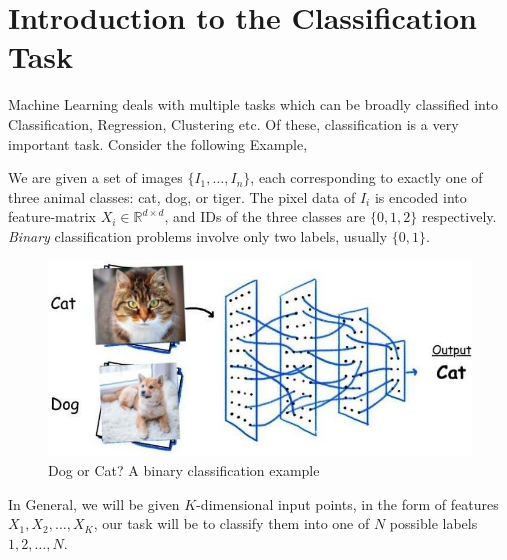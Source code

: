 \documentclass[12pt]{article}
\begin{document}
\section{Introduction to the Classification Task}
Machine Learning deals with multiple tasks which can be broadly classified into Classification, Regression, Clustering etc. Of these, classification is a very important task. Consider the following Example,

We are given a set of images $\{I_1, \dots, I_n\}$, each corresponding to exactly one of three animal classes: cat, dog, or tiger. The pixel data of $I_i$ is encoded into feature-matrix $X_i \in \mathbb{R}^{d\times d}$, and IDs of the three classes are $\{0,1,2\}$ respectively. \textit{Binary} classification problems involve only two labels, usually $\{0,1\}$.
\\
\begin{figure}[H]

\centering
\includegraphics[scale=0.5]{classification.png}
\caption{Dog or Cat? A binary classification example }
\end{figure}
In General, we will be given $K$-dimensional input points, in the form of features  $X_1, X_2, \dots, X_K$,  our task will be to classify them into one of $N$ possible labels $1,2,\dots,N$.\\
\end{document}

